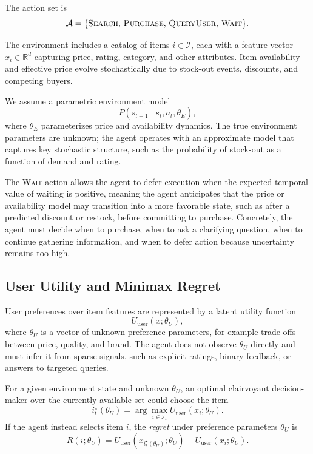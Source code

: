 \documentclass[11pt]{article}
\begin{document}
The action set is
\begin{equation}
\mathcal{A} = \{\textsc{Search},\, \textsc{Purchase},\, \textsc{QueryUser},\, \textsc{Wait}\}.
\end{equation}

The environment includes a catalog of items $i \in \mathcal{I}$, each with a feature vector $x_i \in \mathbb{R}^d$ capturing price, rating, category, and other attributes. Item availability and effective price evolve stochastically due to stock-out events, discounts, and competing buyers.

We assume a parametric environment model
\begin{equation}
P(s_{t+1} \mid s_t, a_t, \theta_E),
\end{equation}
where $\theta_E$ parameterizes price and availability dynamics. The true environment parameters are unknown; the agent operates with an approximate model that captures key stochastic structure, such as the probability of stock-out as a function of demand and rating.

The \textsc{Wait} action allows the agent to defer execution when the expected temporal value of waiting is positive, meaning the agent anticipates that the price or availability model may transition into a more favorable state, such as after a predicted discount or restock, before committing to purchase. Concretely, the agent must decide when to purchase, when to ask a clarifying question, when to continue gathering information, and when to defer action because uncertainty remains too high.

\subsection{User Utility and Minimax Regret}

User preferences over item features are represented by a latent utility function
\begin{equation}
U_{\text{user}}(x; \theta_U),
\end{equation}
where $\theta_U$ is a vector of unknown preference parameters, for example trade-offs between price, quality, and brand. The agent does not observe $\theta_U$ directly and must infer it from sparse signals, such as explicit ratings, binary feedback, or answers to targeted queries.

For a given environment state and unknown $\theta_U$, an optimal clairvoyant decision-maker over the currently available set could choose the item
\begin{equation}
i_t^\star(\theta_U) = \arg\max_{i \in \mathcal{I}_t} U_{\text{user}}(x_i; \theta_U).
\end{equation}
If the agent instead selects item $i$, the \emph{regret} under preference parameters $\theta_U$ is
\begin{equation}
R(i; \theta_U) = U_{\text{user}}(x_{i_t^\star(\theta_U)}; \theta_U) - U_{\text{user}}(x_i; \theta_U).
\end{equation}
\end{document}
